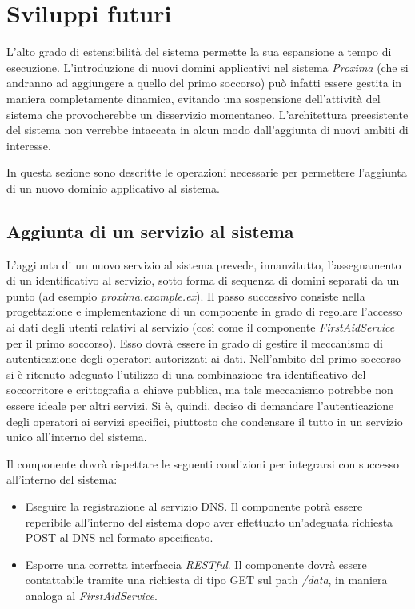 \documentclass[a4paper,12pt]{report}
\begin{document}
\section{Sviluppi futuri} \label{future-work}
L'alto grado di estensibilità del sistema permette la sua espansione a tempo di esecuzione. L'introduzione di nuovi domini applicativi nel sistema \emph{Proxima} (che si andranno ad aggiungere a quello del primo soccorso) può infatti essere gestita in maniera completamente dinamica, evitando una sospensione dell'attività del sistema che provocherebbe un disservizio momentaneo. L'architettura preesistente del sistema non verrebbe intaccata in alcun modo dall'aggiunta di nuovi ambiti di interesse. 

In questa sezione sono descritte le operazioni necessarie per permettere l'aggiunta di un nuovo dominio applicativo al sistema.

\subsection{Aggiunta di un servizio al sistema}
L'aggiunta di un nuovo servizio al sistema prevede, innanzitutto, l'assegnamento di un identificativo al servizio, sotto forma di sequenza di domini separati da un punto (ad esempio \emph{proxima.example.ex}). Il passo successivo consiste nella progettazione e implementazione di un componente in grado di regolare l'accesso ai dati degli utenti relativi al servizio (così come il componente \emph{FirstAidService} per il primo soccorso). Esso dovrà essere in grado di gestire il meccanismo di autenticazione degli operatori autorizzati ai dati. Nell'ambito del primo soccorso si è ritenuto adeguato l'utilizzo di una combinazione tra identificativo del soccorritore e crittografia a chiave pubblica, ma tale meccanismo potrebbe non essere ideale per altri servizi. Si è, quindi, deciso di demandare l'autenticazione degli operatori ai servizi specifici, piuttosto che condensare il tutto in un servizio unico all'interno del sistema. 

Il componente dovrà rispettare le seguenti condizioni per integrarsi con successo all'interno del sistema:
\begin{itemize}
	\item Eseguire la registrazione al servizio DNS. Il componente potrà essere reperibile all'interno del sistema dopo aver effettuato un'adeguata richiesta POST al DNS nel formato specificato.
	\item Esporre una corretta interfaccia \emph{RESTful}. Il componente dovrà essere contattabile tramite una richiesta di tipo GET sul path \emph{/data}, in maniera analoga al \emph{FirstAidService}.
\end{itemize}
\end{document}
